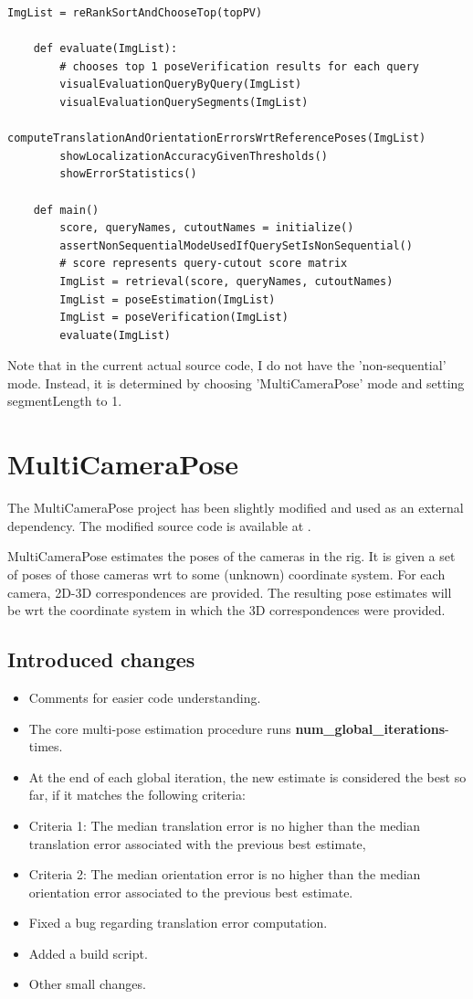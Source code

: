 \documentclass[twoside]{ctuthesis}
\theoremstyle{plain}
\theoremstyle{definition}
\theoremstyle{note}
\newcommand{\todo}[1][]{%
\ifthenelse{\isempty{#1}}{\textbf{TODO}}{\textbf{TODO: #1}}%
}
\begin{document}
\begin{lstlisting}[style=pseudocode, caption={InLocCIIRC pseudocode. \todo[pseudocode review.]}]
		ImgList = reRankSortAndChooseTop(topPV)

	def evaluate(ImgList):
		# chooses top 1 poseVerification results for each query
		visualEvaluationQueryByQuery(ImgList)
		visualEvaluationQuerySegments(ImgList)
		computeTranslationAndOrientationErrorsWrtReferencePoses(ImgList)
		showLocalizationAccuracyGivenThresholds()
		showErrorStatistics()

	def main()
		score, queryNames, cutoutNames = initialize()
		assertNonSequentialModeUsedIfQuerySetIsNonSequential()
		# score represents query-cutout score matrix
		ImgList = retrieval(score, queryNames, cutoutNames)
		ImgList = poseEstimation(ImgList)
		ImgList = poseVerification(ImgList)
		evaluate(ImgList)
\end{lstlisting}

Note that in the current actual source code, I do not have the 'non-sequential' mode. Instead, it is determined by choosing 'MultiCameraPose' mode and setting segmentLength to 1.

\section{MultiCameraPose}
The MultiCameraPose project has been slightly modified and used as an external dependency. The modified source code is available at \cite{MultiCameraPose}.

MultiCameraPose estimates the poses of the cameras in the rig. It is given a set of poses of those cameras wrt to some (unknown) coordinate system. For each camera, 2D-3D correspondences are provided. The resulting pose estimates will be wrt the coordinate system in which the 3D correspondences were provided.

\subsection{Introduced changes}
\begin{itemize}
	\item Comments for easier code understanding.
	\item The core multi-pose estimation procedure runs \textbf{num\_global\_iterations}-times.
	\item At the end of each global iteration, the new estimate is considered the best so far, if it matches the following criteria:
	\item Criteria 1: The median translation error is no higher than the median translation error associated with the previous best estimate,
	\item Criteria 2: The median orientation error is no higher than the median orientation error associated to the previous best estimate.
	\item Fixed a bug regarding translation error computation.
	\item Added a build script.
	\item Other small changes.
\end{itemize}
\end{document}
